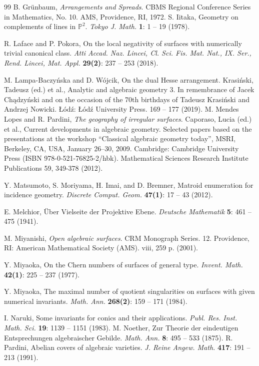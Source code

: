 \documentclass{article}
\theoremstyle{plain}
\theoremstyle{definition}
\numberwithin{equation}{section}
\begin{document}
\begin{thebibliography}{99}
B. Gr\"unbaum, \newblock \textit{Arrangements  and  Spreads}. \newblock CBMS  Regional  Conference  Series in Mathematics, No. 10.  AMS, Providence, RI, 1972.
S. Iitaka, \newblock Geometry on complements of lines in $\mathbb{P}^{2}$. \newblock  \textit{Tokyo J. Math.} \textbf{1}: 1 -- 19 (1978).

R. Laface and P. Pokora, On the local negativity of surfaces with numerically trivial canonical class. \textit{Atti Accad. Naz. Lincei, Cl. Sci. Fis. Mat. Nat., IX. Ser., Rend. Lincei, Mat. Appl.} \textbf{29(2)}: 237 -- 253 (2018).

M. Lampa-Baczy\'nska and D. W\'ojcik, On the dual Hesse arrangement. Krasiński, Tadeusz (ed.) et al., Analytic and algebraic geometry 3. In remembrance of Jacek Chądzyński and on the occasion of the 70th birthdays of Tadeusz Krasiński and Andrzej Nowicki. Łódź: Łódź University Press. 169 -- 177 (2019).
M. Mendes Lopes and R.  Pardini, \textit{The geography of irregular surfaces}. Caporaso, Lucia (ed.) et al., Current developments in algebraic geometry. Selected papers based on the presentations at the workshop “Classical algebraic geometry today”, MSRI, Berkeley, CA, USA, January 26–30, 2009. Cambridge: Cambridge University Press (ISBN 978-0-521-76825-2/hbk). Mathematical Sciences Research Institute Publications 59, 349-378 (2012).

Y. Matsumoto, S. Moriyama, H. Imai, and D. Bremner, Matroid enumeration for incidence geometry. \textit{Discrete Comput. Geom.} \textbf{47(1)}: 17 -- 43 (2012).

E. Melchior, \newblock  \"Uber Vielseite der Projektive Ebene. \textit{Deutsche Mathematik} \textbf{5}: 461 -- 475 (1941).

M. Miyanishi, \textit{Open algebraic surfaces}. CRM Monograph Series. 12. Providence, RI: American Mathematical Society (AMS). viii, 259 p. (2001).

Y. Miyaoka, On the Chern numbers of surfaces of general type. \textit{Invent. Math.} \textbf{42(1)}: 225 -- 237 (1977).

Y. Miyaoka, The maximal number of quotient singularities on surfaces with given numerical invariants. \textit{Math. Ann.} \textbf{268(2)}: 159 -- 171 (1984).

I. Naruki, Some invariants for conics and their applications. \textit{Publ. Res. Inst. Math. Sci.} \textbf{19}: 1139 -- 1151 (1983).
M. Noether, Zur Theorie der eindeutigen Entsprechungen algebraischer Gebilde. \textit{Math. Ann.} \textbf{8}: 495 -- 533 (1875).
R. Pardini, Abelian covers of algebraic varieties. \textit{J. Reine Angew. Math.} \textbf{417}: 191 -- 213 (1991).


\end{thebibliography}
\end{document}
